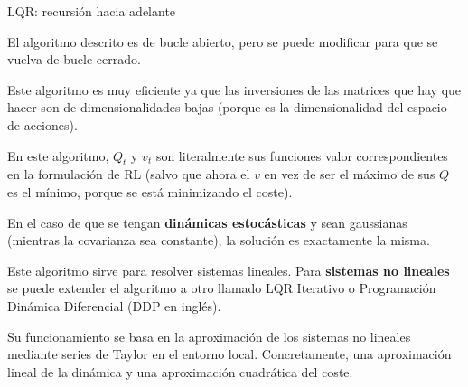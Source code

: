 \begin{algorithm}
    \caption{LQR: recursión hacia adelante}
\end{algorithm}

El algoritmo descrito es de bucle abierto, pero se puede modificar para que se vuelva de bucle
cerrado.

Este algoritmo es muy eficiente ya que las inversiones de las matrices que hay que hacer son de
dimensionalidades bajas (porque es la dimensionalidad del espacio de acciones).

En este algoritmo, $Q_t$ y $v_t$ son literalmente sus funciones valor correspondientes en
la formulación de RL (salvo que ahora el $v$ en vez de ser el máximo de sus $Q$ es el mínimo,
porque se está minimizando el coste).

En el caso de que se tengan \textbf{dinámicas estocásticas} y sean gaussianas
(mientras la covarianza sea constante), la
solución es exactamente la misma.

Este algoritmo sirve para resolver sistemas lineales. Para \textbf{sistemas no lineales} se
puede extender el algoritmo a otro llamado LQR Iterativo o Programación Dinámica
Diferencial (DDP en inglés).

Su funcionamiento se basa en la aproximación de los sistemas no lineales mediante series de
Taylor en el entorno local. Concretamente, una aproximación lineal de la dinámica y una
aproximación cuadrática del coste.


